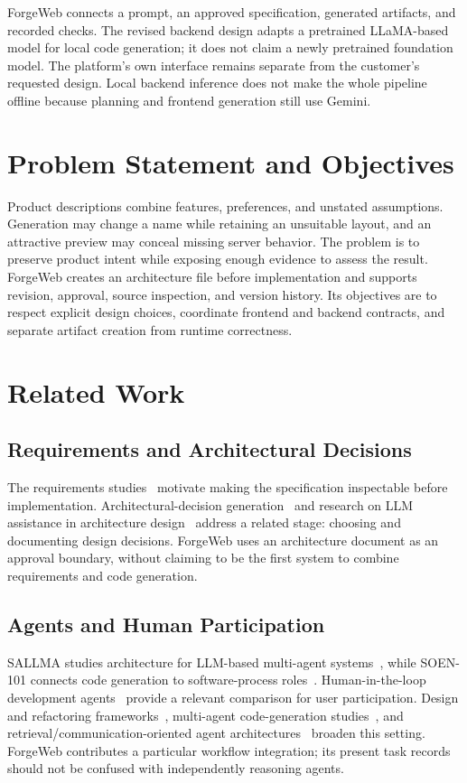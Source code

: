 \documentclass[conference,a4paper]{IEEEtran}
\begin{document}
ForgeWeb connects a prompt, an approved specification, generated artifacts, and recorded checks. The revised backend design adapts a pretrained LLaMA-based model for local code generation; it does not claim a newly pretrained foundation model. The platform's own interface remains separate from the customer's requested design. Local backend inference does not make the whole pipeline offline because planning and frontend generation still use Gemini.

\section{Problem Statement and Objectives}
Product descriptions combine features, preferences, and unstated assumptions. Generation may change a name while retaining an unsuitable layout, and an attractive preview may conceal missing server behavior. The problem is to preserve product intent while exposing enough evidence to assess the result. ForgeWeb creates an architecture file before implementation and supports revision, approval, source inspection, and version history. Its objectives are to respect explicit design choices, coordinate frontend and backend contracts, and separate artifact creation from runtime correctness.

\section{Related Work}
\subsection{Requirements and Architectural Decisions}
The requirements studies~\cite{ieee1,ieee2,ieee3} motivate making the specification inspectable before implementation. Architectural-decision generation~\cite{ieee4} and research on LLM assistance in architecture design~\cite{ieee13} address a related stage: choosing and documenting design decisions. ForgeWeb uses an architecture document as an approval boundary, without claiming to be the first system to combine requirements and code generation.

\subsection{Agents and Human Participation}
SALLMA studies architecture for LLM-based multi-agent systems~\cite{ieee5}, while SOEN-101 connects code generation to software-process roles~\cite{ieee6}. Human-in-the-loop development agents~\cite{ieee7} provide a relevant comparison for user participation. Design and refactoring frameworks~\cite{ieee18}, multi-agent code-generation studies~\cite{ieee19}, and retrieval/communication-oriented agent architectures~\cite{ieee20} broaden this setting. ForgeWeb contributes a particular workflow integration; its present task records should not be confused with independently reasoning agents.
\end{document}

